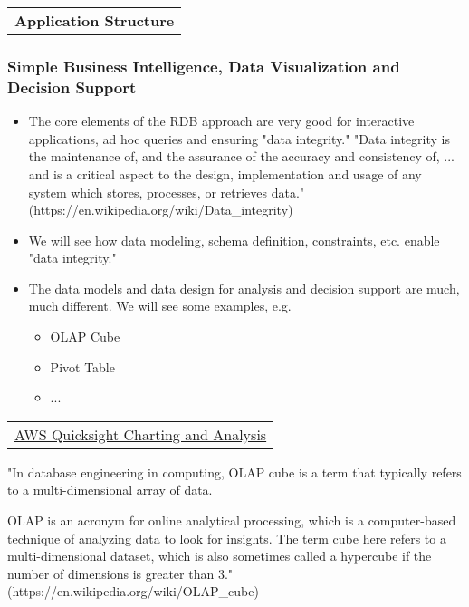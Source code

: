 \documentclass[11pt]{article}
\providecommand{\tightlist}{%
      \setlength{\itemsep}{0pt}\setlength{\parskip}{0pt}}
\begin{document}
\begin{longtable}[]{@{}c@{}}
\toprule
\tabularnewline
\midrule
\endhead
\textbf{Application Structure}\tabularnewline
\bottomrule
\end{longtable}

    \subsubsection{Simple Business Intelligence, Data Visualization and
Decision
Support}\label{simple-business-intelligence-data-visualization-and-decision-support}

\begin{itemize}
\item
  The core elements of the RDB approach are very good for interactive
  applications, ad hoc queries and ensuring "data integrity." "Data
  integrity is the maintenance of, and the assurance of the accuracy and
  consistency of, ... and is a critical aspect to the design,
  implementation and usage of any system which stores, processes, or
  retrieves data." (https://en.wikipedia.org/wiki/Data\_integrity)
\item
  We will see how data modeling, schema definition, constraints, etc.
  enable "data integrity."
\item
  The data models and data design for analysis and decision support are
  much, much different. We will see some examples, e.g.

  \begin{itemize}
  \tightlist
  \item
    OLAP Cube
  \item
    Pivot Table
  \item
    ...
  \end{itemize}
\end{itemize}

\begin{longtable}[]{@{}c@{}}
\toprule
\tabularnewline
\midrule
\endhead
\href{https://aws.amazon.com/quicksight/}{AWS Quicksight Charting and
Analysis}\tabularnewline
\bottomrule
\end{longtable}

    "In database engineering in computing, OLAP cube is a term that
typically refers to a multi-dimensional array of data.

OLAP is an acronym for online analytical processing, which is a
computer-based technique of analyzing data to look for insights. The
term cube here refers to a multi-dimensional dataset, which is also
sometimes called a hypercube if the number of dimensions is greater than
3." (https://en.wikipedia.org/wiki/OLAP\_cube)
\end{document}
